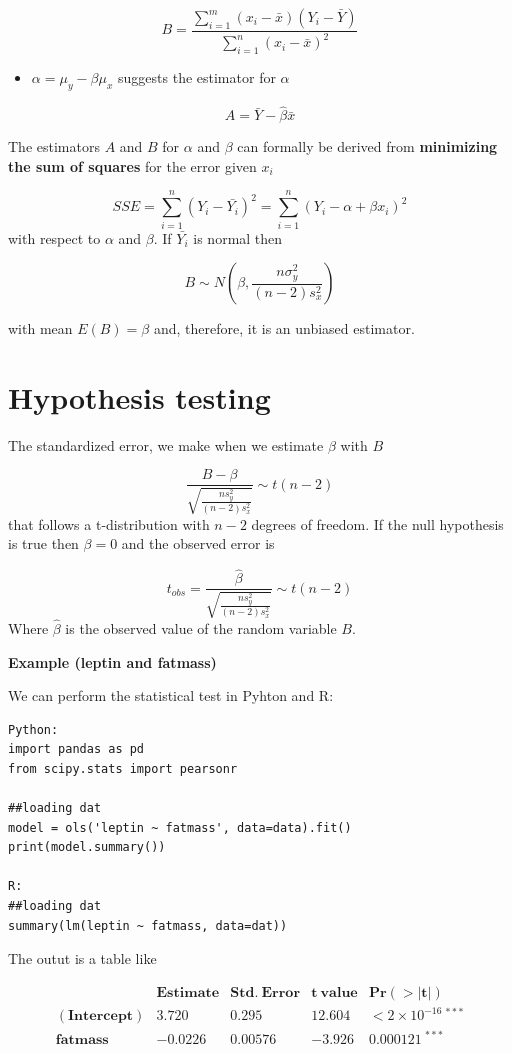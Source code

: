 \documentclass[
]{book}
\providecommand{\tightlist}{%
  \setlength{\itemsep}{0pt}\setlength{\parskip}{0pt}}
\begin{document}
\[B=\frac{\sum_{i=1}^m(x_i-\bar{x})(Y_i-\bar{Y})}{\sum_{i=1}^n(x_i-\bar{x})^2}\]

\begin{itemize}
\tightlist
\item
  \(\alpha=\mu_y-\beta\mu_x\) suggests the estimator for \(\alpha\)
\end{itemize}

\[A=\bar{Y}- \hat{\beta}\bar{x}\]

The estimators \(A\) and \(B\) for \(\alpha\) and \(\beta\) can formally be derived from \textbf{minimizing the sum of squares} for the error given \(x_i\)

\[SSE=\sum_{i=1}^n(Y_i-\bar{Y_i})^2=\sum_{i=1}^n(Y_i-\alpha + \beta x_i)^2\]
with respect to \(\alpha\) and \(\beta\). If \(\bar{Y_i}\) is normal then

\[B \sim N(\beta, \frac{n\sigma^2_y}{{(n-2)s^2_x}})\]

with mean \(E(B)=\beta\) and, therefore, it is an unbiased estimator.

\hypertarget{hypothesis-testing-2}{%
\section{Hypothesis testing}\label{hypothesis-testing-2}}

The standardized error, we make when we estimate \(\beta\) with \(B\)

\[\frac{B -\beta}{\sqrt{\frac{ns^2_y}{{(n-2)s^2_x}}}} \sim t(n-2)\]
that follows a t-distribution with \(n-2\) degrees of freedom. If the null hypothesis is true then \(\beta=0\) and the observed error is

\[t_{obs}= \frac{\hat{\beta}}{\sqrt{\frac{ns^2_y}{{(n-2)s^2_x}}}} \sim t(n-2)\]
Where \(\hat{\beta}\) is the observed value of the random variable \(B\).

\textbf{Example (leptin and fatmass)}

We can perform the statistical test in Pyhton and R:

\begin{verbatim}
Python:
import pandas as pd
from scipy.stats import pearsonr

##loading dat
model = ols('leptin ~ fatmass', data=data).fit()
print(model.summary())

R:
##loading dat
summary(lm(leptin ~ fatmass, data=dat))
\end{verbatim}

The outut is a table like

\[
\begin{array}{lcccc}
 & \mathbf{Estimate} & \mathbf{Std.\ Error} & \mathbf{t\ value} & \mathbf{Pr(>|t|)} \\ 
\mathbf{(Intercept)} & 3.720 & 0.295 & 12.604 & <2 \times 10^{-16} \ ^{***} \\
\mathbf{fatmass}     & -0.0226 & 0.00576 & -3.926 & 0.000121 \ ^{***} \\
\end{array}
\]
\end{document}
